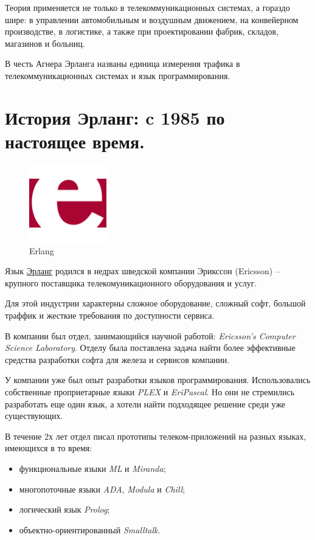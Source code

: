 Теория применяется не только в телекоммуникационных системах, а гораздо шире: в управлении автомобильным и воздушным движением, на конвейерном производстве, в логистике, а также при проектировании фабрик, складов, магазинов и больниц.

В честь Агнера Эрланга названы единица измерения трафика в телекоммуникационных системах и язык программирования.

\section{История Эрланг: c 1985 по настоящее время.}

\begin{figure}[h]
  \centering
  \includegraphics[width=0.3\textwidth]{./lesson_02/img/erlang_logo.png}
  \caption{Erlang}
\end{figure}

Язык \href{https://www.erlang.org/}{Эрланг} родился в недрах шведской компании Эрикссон (Ericsson) -- крупного поставщика телекомуникационного оборудования и услуг.

Для этой индустрии характерны сложное оборудование, сложный софт, большой траффик и жесткие требования по доступности сервиса.

В компании был отдел, занимающийся научной работой: \textit{Ericsson’s Computer Science Laboratory}. Отделу была поставлена задача найти более эффективные средства разработки софта для железа и сервисов компании.

У компании уже был опыт разработки языков программирования. Использовались собственные проприетарные языки \textit{PLEX} и \textit{EriPascal}. Но они не стремились разработать еще один язык, а хотели найти подходящее решение среди уже существующих.

В течение 2х лет отдел писал прототипы телеком-приложений на разных языках, имеющихся в то время:
\begin{itemize}
\item функциональные языки \textit{ML} и \textit{Miranda};
\item многопоточные языки \textit{ADA}, \textit{Modula} и \textit{Chill};
\item логический язык \textit{Prolog};
\item объектно-ориентированный \textit{Smalltalk}.
\end{itemize}

